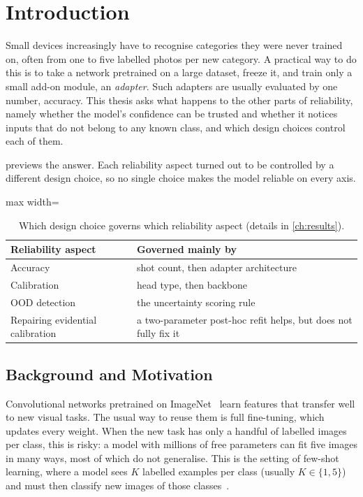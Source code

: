 \chapter{Introduction}
\label{ch:intro}

Small devices increasingly have to recognise categories they were never trained on, often from one
to five labelled photos per new category. A practical way to do this is to take a network pretrained on
a large dataset, freeze it, and train only a small add-on module, an \emph{adapter}. Such adapters are
usually evaluated by one number, accuracy. This thesis asks what happens to the other parts of
reliability, namely whether the model's confidence can be trusted and whether it notices inputs that do
not belong to any known class, and which design choices control each of them.

 previews the answer. Each reliability aspect turned out to be controlled by a
different design choice, so no single choice makes the model reliable on every axis.

\begin{table}[H]
\centering
\caption{Which design choice governs which reliability aspect (details in \cref{ch:results}).}
\label{tab:headline}
\begin{adjustbox}{max width=\textwidth}
\begin{tabular}{@{}ll@{}}
\toprule
Reliability aspect & Governed mainly by \\
\midrule
Accuracy & shot count, then adapter architecture \\
Calibration & head type, then backbone \\
OOD detection & the uncertainty scoring rule \\
Repairing evidential calibration & a two-parameter post-hoc refit helps, but does not fully fix it \\
\bottomrule
\end{tabular}
\end{adjustbox}
\end{table}

\section{Background and Motivation}

Convolutional networks pretrained on ImageNet~\cite{deng2009imagenet} learn features that transfer
well to new visual tasks. The usual way to reuse them is full fine-tuning, which updates every weight.
When the new task has only a handful of labelled images per class, this is risky: a model with millions
of free parameters can fit five images in many ways, most of which do not generalise. This is the
setting of few-shot learning, where a model sees $K$ labelled examples per class (usually $K \in
\{1,5\}$) and must then classify new images of those classes~\cite{vinyals2016matching}.

